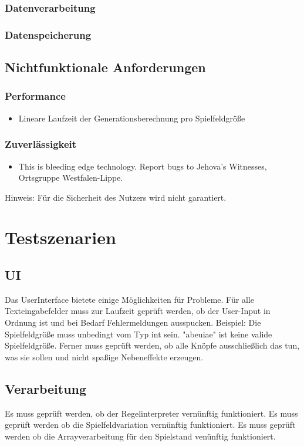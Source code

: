 \documentclass[11pt]{article}
\begin{document}
\subsubsection{Datenverarbeitung}
\subsubsection{Datenspeicherung}
\subsection{Nichtfunktionale Anforderungen}
\subsubsection{Performance}
\begin{itemize}
    \item Lineare Laufzeit der Generationsberechnung pro Spielfeldgröße
\end{itemize}
\subsubsection{Zuverlässigkeit}
\begin{itemize}
    \item This is bleeding edge technology. Report bugs to Jehova's Witnesses, Ortsgruppe Westfalen-Lippe.
\end{itemize}

Hinweis: Für die Sicherheit des Nutzers wird nicht garantiert.
\pagebreak
\section{Testszenarien}
\subsection{UI}
Das UserInterface bietete einige Möglichkeiten für Probleme. Für alle Texteingabefelder muss zur Laufzeit geprüft werden, ob der User-Input in Ordnung ist und bei Bedarf Fehlermeldungen ausspucken. Beispiel: Die Spielfeldgröße muss unbedingt vom Typ int sein. "abeuiae" ist keine valide Spielfeldgröße.
Ferner muss geprüft werden, ob alle Knöpfe ausschließlich das tun, was sie sollen und nicht spaßige Nebeneffekte erzeugen.
\subsection{Verarbeitung}
Es muss geprüft werden, ob der Regelinterpreter vernünftig funktioniert. Es muss geprüft werden ob die Spielfeldvariation vernünftig funktioniert. Es muss geprüft werden ob die Arrayverarbeitung für den Spielstand venünftig funktioniert. 
\end{document}
